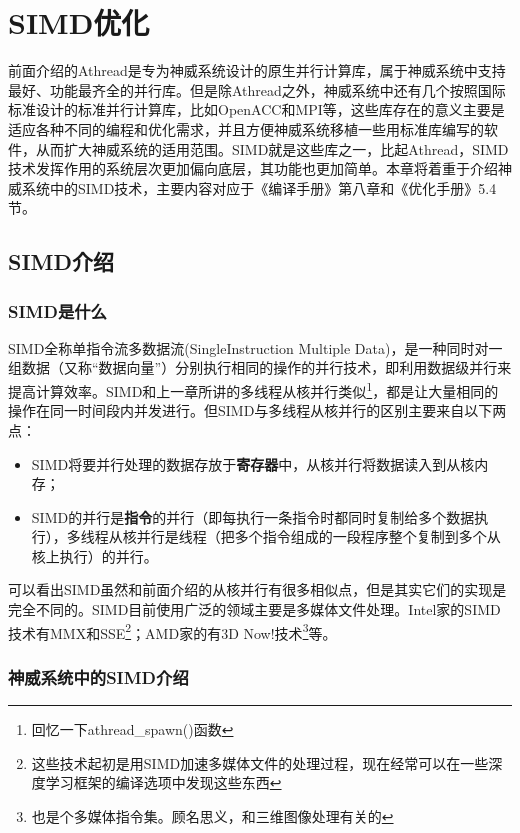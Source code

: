 \chapter{SIMD优化}
前面介绍的Athread是专为神威系统设计的原生并行计算库，属于神威系统中支持最好、功能最齐全的并行库。但是除Athread之外，神威系统中还有几个按照国际标准设计的标准并行计算库，比如OpenACC和MPI等，这些库存在的意义主要是适应各种不同的编程和优化需求，并且方便神威系统移植一些用标准库编写的软件，从而扩大神威系统的适用范围。SIMD就是这些库之一，比起Athread，SIMD技术发挥作用的系统层次更加偏向底层，其功能也更加简单。本章将着重于介绍神威系统中的SIMD技术，主要内容对应于《编译手册》第八章和《优化手册》5.4节。

\section{SIMD介绍}
\subsection{SIMD是什么}
SIMD全称单指令流多数据流(SingleInstruction Multiple Data)，是一种同时对一组数据（又称“数据向量”）分别执行相同的操作的并行技术，即利用数据级并行来提高计算效率。SIMD和上一章所讲的多线程从核并行类似\footnote{回忆一下athread\_spawn()函数}，都是让大量相同的操作在同一时间段内并发进行。但SIMD与多线程从核并行的区别主要来自以下两点：
\begin{itemize}
	\item SIMD将要并行处理的数据存放于\textbf{寄存器}中，从核并行将数据读入到从核内存；
	\item SIMD的并行是\textbf{指令}的并行（即每执行一条指令时都同时复制给多个数据执行），多线程从核并行是线程（把多个指令组成的一段程序整个复制到多个从核上执行）的并行。
\end{itemize}

可以看出SIMD虽然和前面介绍的从核并行有很多相似点，但是其实它们的实现是完全不同的。SIMD目前使用广泛的领域主要是多媒体文件处理。Intel家的SIMD技术有MMX和SSE\footnote{这些技术起初是用SIMD加速多媒体文件的处理过程，现在经常可以在一些深度学习框架的编译选项中发现这些东西}；AMD家的有3D Now!技术\footnote{也是个多媒体指令集。顾名思义，和三维图像处理有关的}等。

\subsection{神威系统中的SIMD介绍}
